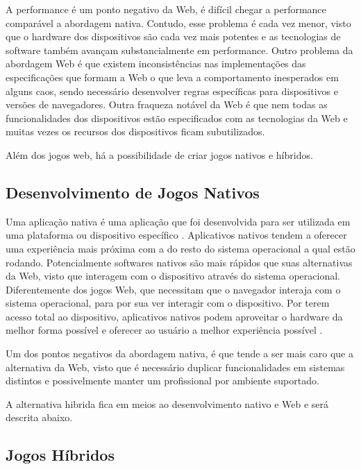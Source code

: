 A performance é um ponto negativo da Web, é difícil chegar a
performance comparável a abordagem nativa. Contudo, esse problema
é cada vez menor, visto que o hardware dos dispositivos são cada
vez mais potentes e as tecnologias de software também avançam
substancialmente em performance. Outro problema da abordagem Web é que
existem inconsistências nas implementações das especificações que
formam a Web o que leva a comportamento inesperados em alguns caos,
sendo necessário desenvolver regras específicas para dispositivos
e versões de navegadores. Outra fraqueza notável da Web é que nem
todas as funcionalidades dos dispositivos estão especificados com as
tecnologias da Web e muitas vezes os recursos dos dispositivos ficam
subutilizados.

Além dos jogos web, há a possibilidade de criar jogos nativos e híbridos.

\subsection{Desenvolvimento de Jogos Nativos}

Uma aplicação nativa é uma aplicação que foi desenvolvida para ser
utilizada em uma plataforma ou dispositivo específico \autocite[p.
7]{aSeriousContender}. Aplicativos nativos tendem a oferecer uma
experiência mais próxima com a do resto do sistema operacional a qual
estão rodando. Potencialmente softwares nativos são mais rápidos
que suas alternativas da Web, visto que interagem com o dispositivo
através do sistema operacional. Diferentemente dos jogos Web, que
necessitam que o navegador interaja com o sistema operacional, para
por sua ver interagir com o dispositivo. Por terem acesso total ao
dispositivo, aplicativos nativos podem aproveitar o hardware da melhor
forma possível e oferecer ao usuário a melhor experiência possível
\autocite[p. 7]{aSeriousContender}.

Um dos pontos negativos da abordagem nativa, é que tende a ser mais
caro que a alternativa da Web, visto que é necessário duplicar
funcionalidades em sistemas distintos e possivelmente manter um
profissional por ambiente suportado.

A alternativa hibrida fica em meios ao desenvolvimento nativo e Web e
será descrita abaixo.

\subsection{Jogos Híbridos}


